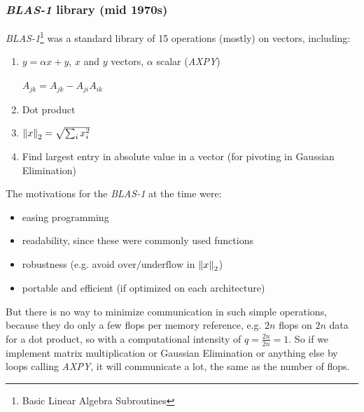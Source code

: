 \documentclass[11pt]{article}
\numberwithin{equation}{section}
\begin{document}
\subsubsection{\textit{BLAS-1} library (mid 1970s)}
\textit{BLAS-1}\footnote{Basic Linear Algebra Subroutines} was a standard library of 15 operations (mostly) on vectors, including:\begin{enumerate}
    \item $y = \alpha x + y$, $x$ and $y$ vectors, $\alpha$ scalar (\textit{AXPY}) 
    \begin{algorithmfrm}
        \begin{algorithmic}[1]
                    \State $A_{jk} = A_{jk} - A_{ji}A_{ik}$
                    \EndFor
        \end{algorithmic}
    \end{algorithmfrm}
    \item Dot product
    \item $\left\| x \right\|_2 = \sqrt{\sum_i x_i^2}$
    \item Find largest entry in absolute value in a vector (for pivoting in Gaussian Elimination)
\end{enumerate}

The motivations for the \textit{BLAS-1} at the time were: \begin{itemize}
    \item easing programming
    \item readability, since these were commonly used functions
    \item robustness (e.g. avoid $\mathrm{over}/\mathrm{underflow}$ in $\left\| x \right\|_2$)
    \item portable and efficient (if optimized on each architecture)
\end{itemize}
But there is no way to minimize communication in such simple operations, because they do only a few flops per memory reference,
e.g. $2n$ flops on $2n$ data for a dot product, so with a computational intensity of $q=\frac{2n}{2n}=1$. 
So if we implement matrix multiplication or Gaussian Elimination or anything else by loops calling \textit{AXPY}, it will communicate a lot, 
the same as the number of flops.
\end{document}
